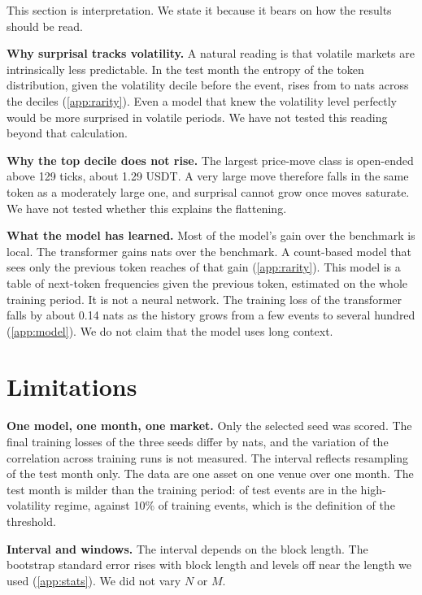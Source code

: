 \documentclass[11pt]{article}
\begin{document}
This section is interpretation.
We state it because it bears on how the results should be read.

\textbf{Why surprisal tracks volatility.}
A natural reading is that volatile markets are intrinsically less predictable.
In the test month the entropy of the token distribution, given the volatility decile before the event, rises from \EntLow{} to \EntHigh{} nats across the deciles (\cref{app:rarity}).
Even a model that knew the volatility level perfectly would be more surprised in volatile periods.
We have not tested this reading beyond that calculation.

\textbf{Why the top decile does not rise.}
The largest price-move class is open-ended above 129 ticks, about 1.29 USDT.
A very large move therefore falls in the same token as a moderately large one, and surprisal cannot grow once moves saturate.
We have not tested whether this explains the flattening.

\textbf{What the model has learned.}
Most of the model's gain over the benchmark is local.
The transformer gains \ModelGain{} nats over the benchmark.
A count-based model that sees only the previous token reaches \PrevShare{} of that gain (\cref{app:rarity}).
This model is a table of next-token frequencies given the previous token, estimated on the whole training period.
It is not a neural network.
The training loss of the transformer falls by about 0.14 nats as the history grows from a few events to several hundred (\cref{app:model}).
We do not claim that the model uses long context.

\section{Limitations}\label{sec:limits}

\textbf{One model, one month, one market.}
Only the selected seed was scored.
The final training losses of the three seeds differ by \SeedSpread{} nats, and the variation of the correlation across training runs is not measured.
The interval reflects resampling of the test month only.
The data are one asset on one venue over one month.
The test month is milder than the training period: \FlagShare{} of test events are in the high-volatility regime, against 10\% of training events, which is the definition of the threshold.

\textbf{Interval and windows.}
The interval depends on the block length.
The bootstrap standard error rises with block length and levels off near the length we used (\cref{app:stats}).
We did not vary $N$ or $M$.
\end{document}
